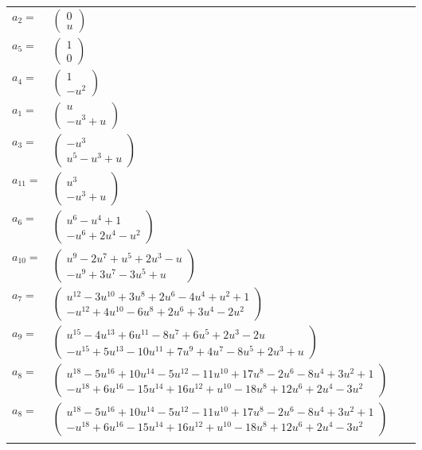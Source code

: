 \documentclass[1p]{elsarticle_modified}
\theoremstyle{definition}
\begin{document}
\begin{tabular}{m{7pt} m{180pt} m{7pt} m{180pt} }
\flushright $a_{2}=$&$\begin{pmatrix}0\\u\end{pmatrix}$ \\
\flushright $a_{5}=$&$\begin{pmatrix}1\\0\end{pmatrix}$ \\
\flushright $a_{4}=$&$\begin{pmatrix}1\\- u^2\end{pmatrix}$ \\
\flushright $a_{1}=$&$\begin{pmatrix}u\\- u^3+u\end{pmatrix}$ \\
\flushright $a_{3}=$&$\begin{pmatrix}- u^3\\u^5- u^3+u\end{pmatrix}$ \\
\flushright $a_{11}=$&$\begin{pmatrix}u^3\\- u^3+u\end{pmatrix}$ \\
\flushright $a_{6}=$&$\begin{pmatrix}u^6- u^4+1\\- u^6+2 u^4- u^2\end{pmatrix}$ \\
\flushright $a_{10}=$&$\begin{pmatrix}u^9-2 u^7+u^5+2 u^3- u\\- u^9+3 u^7-3 u^5+u\end{pmatrix}$ \\
\flushright $a_{7}=$&$\begin{pmatrix}u^{12}-3 u^{10}+3 u^8+2 u^6-4 u^4+u^2+1\\- u^{12}+4 u^{10}-6 u^8+2 u^6+3 u^4-2 u^2\end{pmatrix}$ \\
\flushright $a_{9}=$&$\begin{pmatrix}u^{15}-4 u^{13}+6 u^{11}-8 u^7+6 u^5+2 u^3-2 u\\- u^{15}+5 u^{13}-10 u^{11}+7 u^9+4 u^7-8 u^5+2 u^3+u\end{pmatrix}$ \\
\flushright $a_{8}=$&$\begin{pmatrix}u^{18}-5 u^{16}+10 u^{14}-5 u^{12}-11 u^{10}+17 u^8-2 u^6-8 u^4+3 u^2+1\\- u^{18}+6 u^{16}-15 u^{14}+16 u^{12}+u^{10}-18 u^8+12 u^6+2 u^4-3 u^2\end{pmatrix}$\\ \flushright $a_{8}=$&$\begin{pmatrix}u^{18}-5 u^{16}+10 u^{14}-5 u^{12}-11 u^{10}+17 u^8-2 u^6-8 u^4+3 u^2+1\\- u^{18}+6 u^{16}-15 u^{14}+16 u^{12}+u^{10}-18 u^8+12 u^6+2 u^4-3 u^2\end{pmatrix}$\\&\end{tabular}
\end{document}
